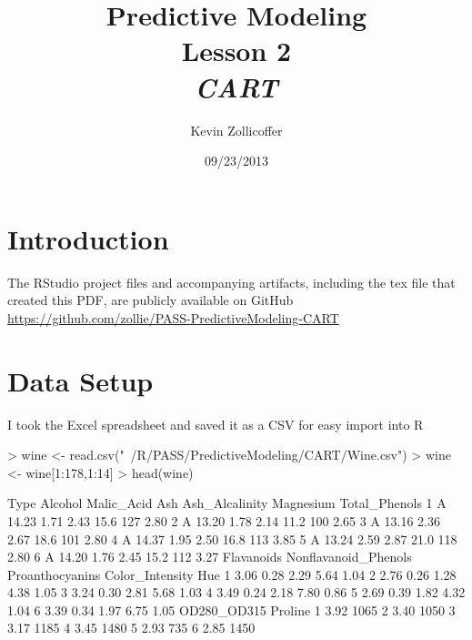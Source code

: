 \documentclass{article}
\author{Kevin Zollicoffer}
\title{Predictive Modeling\\Lesson 2\\\emph{CART}}
\date{09/23/2013}
\begin{document}
\maketitle


\section*{Introduction}
The RStudio project files and accompanying artifacts, including the tex file that created this PDF, are publicly available on GitHub
\\
\url{https://github.com/zollie/PASS-PredictiveModeling-CART}

\section*{Data Setup}
I took the Excel spreadsheet and saved it as a CSV for easy import into R
\begin{Schunk}
\begin{Sinput}
> wine <- read.csv("~/R/PASS/PredictiveModeling/CART/Wine.csv")
> wine <- wine[1:178,1:14]
> head(wine)
\end{Sinput}
\begin{Soutput}
  Type Alcohol Malic_Acid  Ash Ash_Alcalinity Magnesium Total_Phenols
1    A   14.23       1.71 2.43           15.6       127          2.80
2    A   13.20       1.78 2.14           11.2       100          2.65
3    A   13.16       2.36 2.67           18.6       101          2.80
4    A   14.37       1.95 2.50           16.8       113          3.85
5    A   13.24       2.59 2.87           21.0       118          2.80
6    A   14.20       1.76 2.45           15.2       112          3.27
  Flavanoids Nonflavanoid_Phenols Proanthocyanins Color_Intensity  Hue
1       3.06                 0.28            2.29            5.64 1.04
2       2.76                 0.26            1.28            4.38 1.05
3       3.24                 0.30            2.81            5.68 1.03
4       3.49                 0.24            2.18            7.80 0.86
5       2.69                 0.39            1.82            4.32 1.04
6       3.39                 0.34            1.97            6.75 1.05
  OD280_OD315 Proline
1        3.92    1065
2        3.40    1050
3        3.17    1185
4        3.45    1480
5        2.93     735
6        2.85    1450
\end{Soutput}
\end{Schunk}
\end{document}

